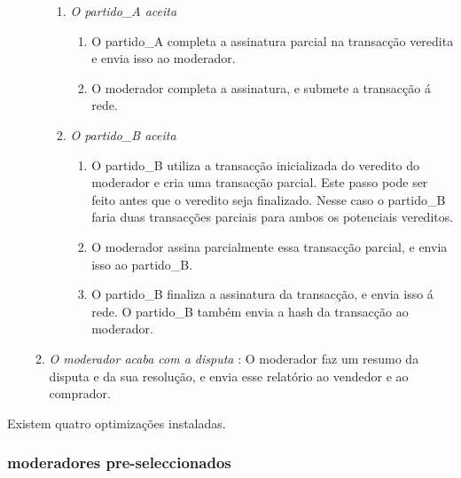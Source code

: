 \begin{enumerate}
\begin{enumerate}
        \begin{enumerate}
            \item {\em O partido\_A aceita}
            \begin{enumerate}
                \item O partido\_A completa a assinatura parcial na transacção veredita e envia isso ao moderador.  
                \item O moderador completa a assinatura, e submete a transacção á rede.
            \end{enumerate}{}
            \item {\em O partido\_B aceita}
            \begin{enumerate}
                \item O partido\_B utiliza a transacção inicializada do veredito do moderador e cria uma transacção parcial. Este passo pode ser feito antes que o veredito seja finalizado. Nesse caso o partido\_B faria duas transacções parciais para ambos os potenciais vereditos.    
                \item O moderador assina parcialmente essa transacção parcial, e envia isso ao partido\_B.
                \item O partido\_B finaliza a assinatura da transacção, e envia isso á rede. O partido\_B também envia a hash da transacção ao moderador.   
            \end{enumerate}{}
        \end{enumerate}{}
        \item {\em O moderador acaba com a disputa} : O moderador faz um resumo da disputa e da sua resolução, e envia esse relatório ao vendedor e ao comprador.
    \end{enumerate}{}
\end{enumerate}{}

Existem quatro optimizações instaladas.

\subsubsection*{moderadores pre-seleccionados}


